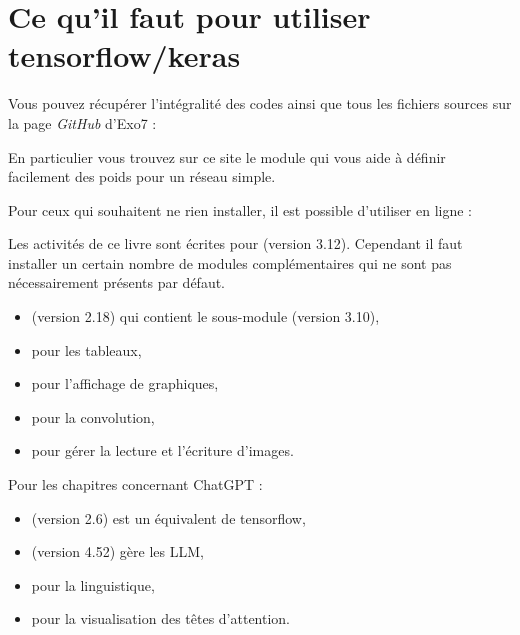 \documentclass[11pt,class=report,crop=false]{standalone}
\begin{document}
\section{Ce qu'il faut pour utiliser tensorflow/keras}


Vous pouvez récupérer l'intégralité des codes \Python{} ainsi que tous les fichiers sources sur la page \emph{GitHub} d'Exo7 :

En particulier vous trouvez sur ce site le module  qui vous aide à définir facilement des poids pour un réseau simple.


\medskip

Pour ceux qui souhaitent ne rien installer, il est possible d'utiliser \tensorflow{} en ligne :

\medskip


Les activités de ce livre sont écrites pour \Python{} (version 3.12).
Cependant il faut installer un certain nombre de modules complémentaires qui ne sont pas nécessairement présents par défaut. 

\begin{itemize}
  \item {} (version 2.18) qui contient le sous-module  (version 3.10),
  \item {} pour les tableaux,
  \item {} pour l'affichage de graphiques,
  \item {} pour la convolution,  
  \item {} pour gérer la lecture et l'écriture d'images.
\end{itemize}  

Pour les chapitres concernant ChatGPT :
\begin{itemize}
	\item {} (version 2.6) est un équivalent de tensorflow,
	\item {} (version 4.52) gère les LLM,
	\item {} pour la linguistique,
	\item {} pour la visualisation des têtes d'attention.
\end{itemize} 

\medskip
\end{document}
